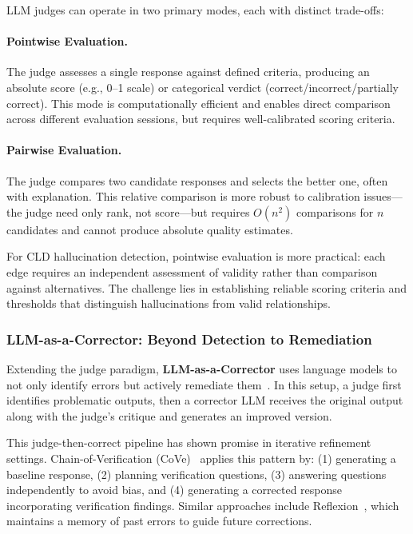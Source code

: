 LLM judges can operate in two primary modes, each with distinct trade-offs:

\paragraph{Pointwise Evaluation.} The judge assesses a single response against defined criteria, producing an absolute score (e.g., 0--1 scale) or categorical verdict (correct/incorrect/partially correct). This mode is computationally efficient and enables direct comparison across different evaluation sessions, but requires well-calibrated scoring criteria.

\paragraph{Pairwise Evaluation.} The judge compares two candidate responses and selects the better one, often with explanation. This relative comparison is more robust to calibration issues---the judge need only rank, not score---but requires $O(n^2)$ comparisons for $n$ candidates and cannot produce absolute quality estimates.

For CLD hallucination detection, pointwise evaluation is more practical: each edge requires an independent assessment of validity rather than comparison against alternatives. The challenge lies in establishing reliable scoring criteria and thresholds that distinguish hallucinations from valid relationships.

\subsubsection{LLM-as-a-Corrector: Beyond Detection to Remediation}

Extending the judge paradigm, \textbf{LLM-as-a-Corrector} uses language models to not only identify errors but actively remediate them~\citep{shinn2024reflexion, dhuliawala2024chain}. In this setup, a judge first identifies problematic outputs, then a corrector LLM receives the original output along with the judge's critique and generates an improved version.

This judge-then-correct pipeline has shown promise in iterative refinement settings. Chain-of-Verification (CoVe)~\citep{dhuliawala2024chain} applies this pattern by: (1) generating a baseline response, (2) planning verification questions, (3) answering questions independently to avoid bias, and (4) generating a corrected response incorporating verification findings. Similar approaches include Reflexion~\citep{shinn2024reflexion}, which maintains a memory of past errors to guide future corrections.

